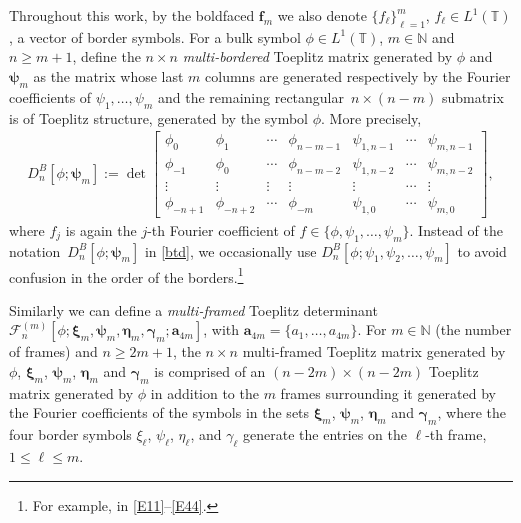 \documentclass[pdftex]{sigma}
\numberwithin{equation}{section}
\newcommand{\N}{{\mathbb N}}
\newcommand{\T}{{\mathbb T}}
\newcommand{\ga}{\gamma}
\begin{document}
Throughout this work, by the boldfaced $\boldsymbol{{f}}_m$ we also denote $\{f_\ell\}^{m}_{\ell=1}$, $f_{\ell} \in L^1(\T)$, a vector of border symbols. For a bulk symbol $\phi \in L^1(\T)$, $m \in \N$ and $n \geq m+1$, define the $n\times n$ \textit{multi-bordered} Toeplitz matrix generated by $\phi$ and $\boldsymbol{\psi}_m$ as the matrix whose last $m$ columns are generated respectively by the Fourier coefficients of $\psi_1, \dots, \psi_m$ and the remaining rectangular~${n\times (n-m)}$ submatrix is of Toeplitz structure, generated by the symbol $\phi$. More precisely,
\begin{gather}\label{btd}
	D^B_n[\phi;\boldsymbol{\psi}_m] := \det \begin{bmatrix}
		\phi_0& \phi_{1} & \cdots & \phi_{n-m-1} & \psi_{1,n-1} & \cdots & \psi_{m,n-1} \\
		\phi_{-1}& \phi_0 & \cdots & \phi_{n-m-2} & \psi_{1,n-2} & \cdots & \psi_{m,n-2} \\
		\vdots & \vdots & \vdots & \vdots & \vdots & \cdots & \vdots \\
		\phi_{-n+1} & \phi_{-n+2} & \cdots & \phi_{-m} & \psi_{1,0} & \cdots & \psi_{m,0}
	\end{bmatrix},
\end{gather}
where $f_j$ is again the $j$-th Fourier coefficient of $f \in \{ \phi, \psi_1, \dots, \psi_m \}$. Instead of the notation~${D^B_n[\phi;\boldsymbol{\psi}_m]}$ in \eqref{btd}, we occasionally use $D^B_n[\phi;\psi_1, \psi_2, \dots, \psi_m]$ to avoid confusion in the order of the borders.\footnote{For example, in \eqref{E11}--\eqref{E44}.}

Similarly we can define a \textit{multi-framed} Toeplitz determinant $ \mathscr{F}^{(m)}_{n}[\phi; \boldsymbol{\xi}_m, \boldsymbol{\psi}_m, \boldsymbol{\eta}_m, \boldsymbol{\ga}_m; \boldsymbol{a}_{4m}]$, with $\boldsymbol{a}_{4m} = \{ a_1, \dots, a_{4m} \}$. For $m \in \N$ (the number of frames) and $n \geq 2m+1$, the $n\times n$ multi-framed Toeplitz matrix generated by $\phi$, $\boldsymbol{\xi}_m$, $\boldsymbol{\psi}_m$, $\boldsymbol{\eta}_m$ and $\boldsymbol{\ga}_m$ is comprised of an $(n-2m)\times(n-2m)$ Toeplitz matrix generated by $\phi$ in addition to the $m$ frames surrounding it generated by the Fourier coefficients of the symbols in the sets $\boldsymbol{\xi}_m$, $\boldsymbol{\psi}_m$, $\boldsymbol{\eta}_m$ and $\boldsymbol{\ga}_m$, where the four border symbols $\xi_{\ell}$, $\psi_{\ell}$, $\eta_{\ell}$, and $\ga_{\ell}$ generate the entries on the $\ell$-th frame, $1\leq \ell \leq m$.
\end{document}
